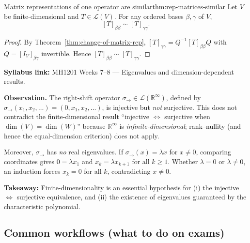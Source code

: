 \begin{theorem}{Matrix representations of one operator are similar}{thm:rep-matrices-similar}
Let $V$ be finite-dimensional and $T\in\mathcal{L}(V)$. For any ordered bases $\beta,\gamma$ of $V$,
\[
[T]_{\beta\beta}\sim [T]_{\gamma\gamma}.
\]
\end{theorem}

\begin{proof}
By Theorem~\ref{thm:change-of-matrix-rep}, $[T]_{\gamma\gamma}=Q^{-1}[T]_{\beta\beta}Q$ with $Q=[I_V]_{\beta\gamma}$ invertible.
Hence $[T]_{\beta\beta}\sim [T]_{\gamma\gamma}$.
\end{proof}

\begin{extension}[title={Extension (Tutorial 7, Question 3): infinite-dimensional phenomena}]
\textbf{Syllabus link:} MH1201 Weeks 7--8 --- Eigenvalues and dimension-dependent results.

\textbf{Observation.} The right-shift operator $\sigma_\to\in\mathcal{L}(\mathbb{R}^\infty)$, defined by $\sigma_\to(x_1,x_2,\dots)=(0,x_1,x_2,\dots)$, is injective but \emph{not} surjective.
This does not contradict the finite-dimensional result ``injective $\Leftrightarrow$ surjective when $\dim(V)=\dim(W)$'' because $\mathbb{R}^\infty$ is \emph{infinite-dimensional}; rank--nullity (and hence the equal-dimension criterion) does not apply.

Moreover, $\sigma_\to$ has \emph{no} real eigenvalues.
If $\sigma_\to(x)=\lambda x$ for $x\neq 0$, comparing coordinates gives $0=\lambda x_1$ and $x_k=\lambda x_{k+1}$ for all $k\ge 1$.
Whether $\lambda=0$ or $\lambda\neq 0$, an induction forces $x_k=0$ for all $k$, contradicting $x\neq 0$.

\textbf{Takeaway:} Finite-dimensionality is an essential hypothesis for (i) the injective $\Leftrightarrow$ surjective equivalence, and (ii) the existence of eigenvalues guaranteed by the characteristic polynomial.
\end{extension}

\subsection{Common workflows (what to do on exams)}

